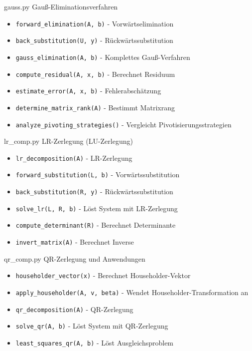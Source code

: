 \begin{KR}{gauss.py}
    Gauß-Eliminationsverfahren
    \begin{itemize}
        \item \texttt{forward\_elimination(A, b)} - Vorwärtselimination
        \item \texttt{back\_substitution(U, y)} - Rückwärtssubstitution
        \item \texttt{gauss\_elimination(A, b)} - Komplettes Gauß-Verfahren
        \item \texttt{compute\_residual(A, x, b)} - Berechnet Residuum
        \item \texttt{estimate\_error(A, x, b)} - Fehlerabschätzung
        \item \texttt{determine\_matrix\_rank(A)} - Bestimmt Matrixrang
        \item \texttt{analyze\_pivoting\_strategies()} - Vergleicht Pivotisierungsstrategien
    \end{itemize}
\end{KR}

\begin{KR}{lr\_comp.py}
    LR-Zerlegung (LU-Zerlegung)
    \begin{itemize}
        \item \texttt{lr\_decomposition(A)} - LR-Zerlegung
        \item \texttt{forward\_substitution(L, b)} - Vorwärtssubstitution
        \item \texttt{back\_substitution(R, y)} - Rückwärtssubstitution
        \item \texttt{solve\_lr(L, R, b)} - Löst System mit LR-Zerlegung
        \item \texttt{compute\_determinant(R)} - Berechnet Determinante
        \item \texttt{invert\_matrix(A)} - Berechnet Inverse
    \end{itemize}
\end{KR}

\begin{KR}{qr\_comp.py}
    QR-Zerlegung und Anwendungen
    \begin{itemize}
        \item \texttt{householder\_vector(x)} - Berechnet Householder-Vektor
        \item \texttt{apply\_householder(A, v, beta)} - Wendet Householder-Transformation an
        \item \texttt{qr\_decomposition(A)} - QR-Zerlegung
        \item \texttt{solve\_qr(A, b)} - Löst System mit QR-Zerlegung
        \item \texttt{least\_squares\_qr(A, b)} - Löst Ausgleichsproblem
    \end{itemize}
\end{KR}

